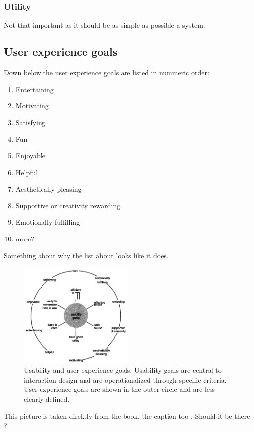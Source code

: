 \subsubsection{Utility}
Not that important as it should be as simple as possible a system.
\subsection{User experience goals}
Down below the user experience goals are listed in nummeric order:
\begin{enumerate}
	\item Entertaining
	\item Motivating
	\item Satisfying
	\item Fun
	\item Enjoyable
	\item Helpful
	\item Aesthetically pleasing
	\item Supportive or creativity rewarding
	\item Emotionally fulfilling
	\item more?
\end{enumerate}
Something about why the list about looks like it does.

\begin{figure}[h!]		%
 \begin{centering}
  \includegraphics[width=0.5\textwidth]{images/usability_goals_diagram.png}
   \caption{Usability and user experience goals. Usability goals are central to
  			interaction design and are operationalized through specific criteria. 
  			User experience goals are shown in the outer circle and are less clearly defined.}
 \end{centering}
\end{figure}

This picture is taken direktly from the book, the caption too . Should it be
there ?
